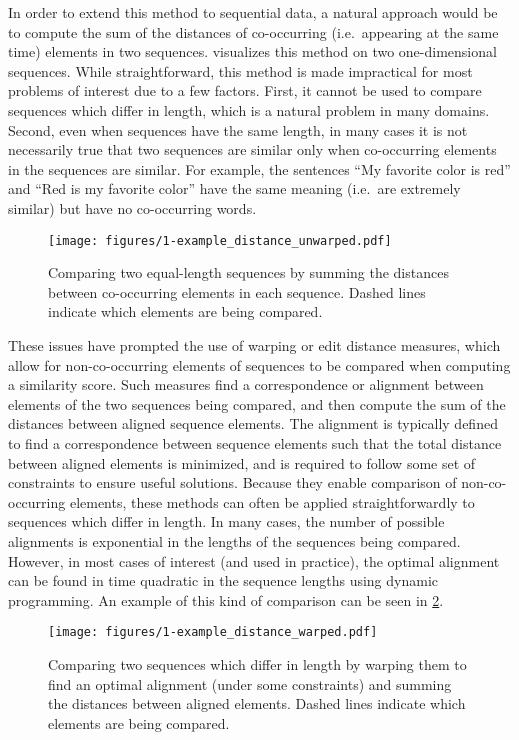 In order to extend this method to sequential data, a natural approach would be to compute the sum of the distances of co-occurring (i.e.\ appearing at the same time) elements in two sequences.
 visualizes this method on two one-dimensional sequences.
While straightforward, this method is made impractical for most problems of interest due to a few factors.
First, it cannot be used to compare sequences which differ in length, which is a natural problem in many domains.
Second, even when sequences have the same length, in many cases it is not necessarily true that two sequences are similar only when co-occurring elements in the sequences are similar.
For example, the sentences ``My favorite color is red'' and ``Red is my favorite color'' have the same meaning (i.e.\ are extremely similar) but have no co-occurring words.

\begin{figure}
  \texttt{[image: figures/1-example\_distance\_unwarped.pdf]}
  \caption[Comparing two sequences without warping]{Comparing two equal-length sequences by summing the distances between co-occurring elements in each sequence.  Dashed lines indicate which elements are being compared.}
  \label{fig:example_distance_unwarped}
\end{figure}

These issues have prompted the use of warping or edit distance measures, which allow for non-co-occurring elements of sequences to be compared when computing a similarity score.
Such measures find a correspondence or alignment between elements of the two sequences being compared, and then compute the sum of the distances between aligned sequence elements.
The alignment is typically defined to find a correspondence between sequence elements such that the total distance between aligned elements is minimized, and is required to follow some set of constraints to ensure useful solutions.
Because they enable comparison of non-co-occurring elements, these methods can often be applied straightforwardly to sequences which differ in length.
In many cases, the number of possible alignments is exponential in the lengths of the sequences being compared.
However, in most cases of interest (and used in practice), the optimal alignment can be found in time quadratic in the sequence lengths using dynamic programming.
An example of this kind of comparison can be seen in \cref{fig:example_distance_warped}.

\begin{figure}
  \texttt{[image: figures/1-example\_distance\_warped.pdf]}
  \caption[Comparing sequences under a warping measure]{Comparing two sequences which differ in length by warping them to find an optimal alignment (under some constraints) and summing the distances between aligned elements.  Dashed lines indicate which elements are being compared.}
  \label{fig:example_distance_warped}
\end{figure}


